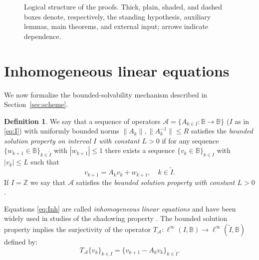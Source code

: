 \documentclass[12pt]{article}
\newcommand{\Bb}{\mathbb{B}}
\newcommand{\Zz}{\mathbb{Z}}
\theoremstyle{definition}
\newtheorem{defin}[thm]{Definition}
\begin{document}
\begin{figure}[t]
{}
\caption{Logical structure of the proofs. Thick, plain, shaded, and dashed boxes denote, respectively, the standing hypothesis, auxiliary lemmas, main theorems, and external input; arrows indicate dependence.}
\label{fig:roadmap}
\end{figure}


\section{Inhomogeneous linear equations}\label{sec:inh}

We now formalize the bounded-solvability mechanism described in Section~\ref{sec:scheme}.

\begin{defin}\label{def:bs}
    We say that a sequence of operators $\mathcal{A} = \{A_{k\in I}:\Bb \to \Bb\}$ ($I$ as in \eqref{eq:I}) with uniformly bounded norms $\|A_k\|, \|A_k^{-1}\| \leq R$ satisfies the \textit{bounded solution property on interval $I$ with constant $L>0$} if  for any sequence $\{w_{k+1} \in \Bb\}_{k \in \tilde{I}}$ with $|w_{k+1}| \leq 1$ there exists a sequence $\{v_k \in \Bb\}_{k \in I}$ with $|v_k| \leq L$ such that
    \begin{equation}\label{eq:Inh}
    v_{k+1} = A_k v_k + w_{k+1}, \quad k \in \tilde{I}.        
    \end{equation}
    If $I = \Zz$ we say that $\mathcal{A}$ satisfies the \textit{bounded solution property with constant $L>0$}.
\end{defin}

Equations \eqref{eq:Inh} are called \textit{inhomogeneous linear equations} \cite{Pli77, Coppel, Maizel1954, Palmer1984, Palmer1988, Slyusarchuk1983, ChiconeLatushkin1999, LRS-JDDE1998} and have been widely used in studies of the shadowing property \cite{Palmer2000, TikhLipSh, TikhHolSh, TikhPerSh, TikhZapSem, MonTikh, PriezzhevsTikh, Pilyugin2010, Todorov2013, Palmer1984, Palmer1988DR, BackesDragicevic2021, BD2019, BD2022}.
The bounded solution property implies the surjectivity of the operator 
$T_{\mathcal{A}}: \ell^{\infty}(I, \Bb) \to \ell^{\infty}(\tilde{I}, \Bb)$ defined by:
\begin{equation}\label{eq:TA}
T_{\mathcal{A}}\{v_k\}_{k \in I} = \{v_{k+1}-A_kv_k\}_{k \in \tilde{I}}.   
\end{equation}
\end{document}
